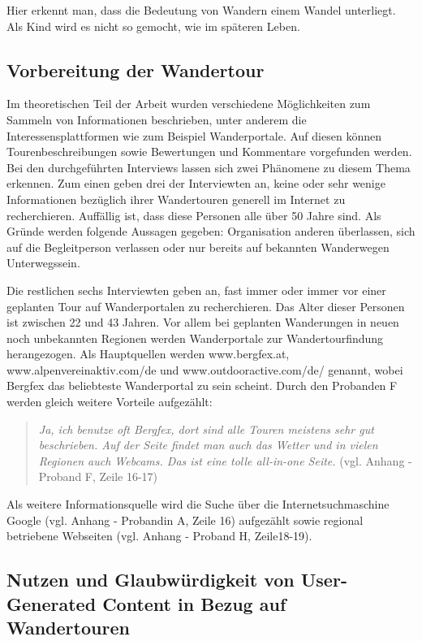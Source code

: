 Hier erkennt man, dass die Bedeutung von Wandern einem Wandel unterliegt. Als Kind wird es nicht so gemocht, wie im späteren Leben.

\subsection{Vorbereitung der Wandertour}

Im theoretischen Teil der Arbeit wurden verschiedene Möglichkeiten zum Sammeln von Informationen beschrieben, unter anderem die Interessensplattformen wie zum Beispiel Wanderportale. Auf diesen können Tourenbeschreibungen sowie Bewertungen und Kommentare vorgefunden werden. Bei den durchgeführten Interviews lassen sich zwei Phänomene zu diesem Thema erkennen. Zum einen geben drei der Interviewten an, keine oder sehr wenige Informationen bezüglich ihrer Wandertouren generell im Internet zu recherchieren. Auffällig ist, dass diese Personen alle über 50 Jahre sind. Als Gründe werden folgende Aussagen gegeben: Organisation anderen überlassen, sich auf die Begleitperson verlassen oder nur bereits auf bekannten Wanderwegen Unterwegssein.

Die restlichen sechs Interviewten geben an, fast immer oder immer vor einer geplanten Tour auf Wanderportalen zu recherchieren. Das Alter dieser Personen ist zwischen 22 und 43 Jahren. Vor allem bei geplanten Wanderungen in neuen noch unbekannten Regionen werden Wanderportale zur Wandertourfindung herangezogen. Als Hauptquellen werden www.bergfex.at, www.alpenvereinaktiv.com/de und www.outdooractive.com/de/ genannt, wobei Bergfex das beliebteste Wanderportal zu sein scheint. 
Durch den Probanden F werden gleich weitere Vorteile aufgezählt:

\begin{quote}
	\textit{\glqq Ja, ich benutze oft Bergfex, dort sind alle Touren meistens sehr gut beschrieben. Auf der Seite findet man auch das Wetter und in vielen Regionen auch Webcams. Das ist eine tolle all-in-one Seite.\grqq} (vgl. Anhang - Proband F, Zeile 16-17)
\end{quote}

Als weitere Informationsquelle wird die Suche über die Internetsuchmaschine Google (vgl. Anhang - Probandin A, Zeile 16) aufgezählt sowie regional betriebene Webseiten (vgl. Anhang - Proband H, Zeile18-19). 

\subsection{Nutzen und Glaubwürdigkeit von User-Generated Content in Bezug auf Wandertouren}

